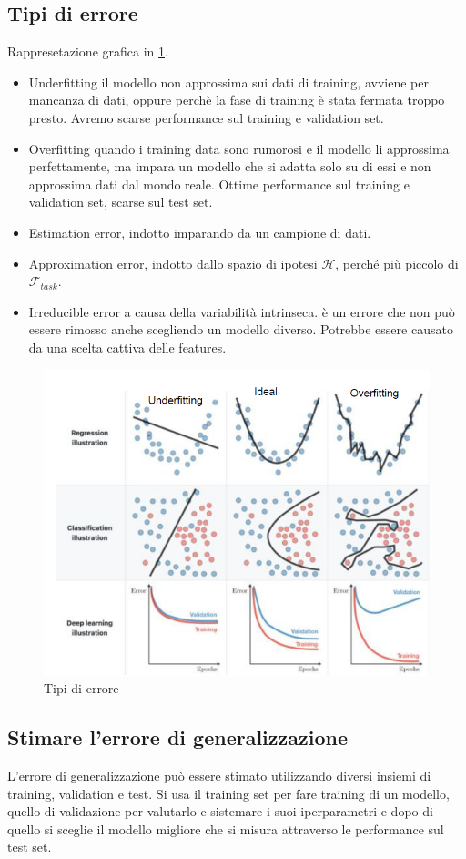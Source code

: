 	\subsection{Tipi di errore}
	Rappresetazione grafica in \ref{fig:chapter02-11}.
	\begin{multicols}{2}
		\begin{itemize}
			\item Underfitting il modello non approssima sui dati di training, avviene per mancanza di dati, oppure perch\`e la fase di training \`e stata fermata troppo presto. Avremo scarse performance sul training e validation set.
			\item Overfitting quando i training data sono rumorosi e il modello li approssima perfettamente, ma impara un modello che si adatta solo su di essi e non approssima dati dal mondo reale. Ottime performance sul training e validation set, scarse sul test set.
			\item Estimation error, indotto imparando da un campione di dati.
			\item Approximation error, indotto dallo spazio di ipotesi $\mathcal{H}$, perché più piccolo di $\mathcal{F}_{task}$.
			\item Irreducible error a causa della variabilit\`a intrinseca. \`e un errore che non può essere rimosso anche scegliendo un modello diverso. Potrebbe essere causato da una scelta cattiva delle features.
		\end{itemize}
	\end{multicols}
	\begin{figure}
		\centering
		\includegraphics[width=0.6\linewidth]{imgs/chapter2/img11}
		\caption{Tipi di errore}
		\label{fig:chapter02-11}
	\end{figure}
	\subsection{Stimare l'errore di generalizzazione}
	L'errore di generalizzazione pu\`o essere stimato utilizzando diversi insiemi di training, validation e test.
	Si usa il training set per fare training di un modello, quello di validazione per valutarlo e sistemare i suoi iperparametri e dopo di quello si sceglie il modello migliore che si misura attraverso le performance sul test set.

